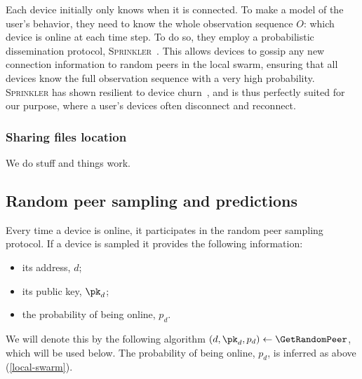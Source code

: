 Each device initially only knows when it is connected. 
To make a model of the user's behavior, they need to know the whole observation sequence $O$: which device is online at each time step.
To do so, they employ a probabilistic dissemination protocol, 
\textsc{Sprinkler}~\cite{luxey:hal-01704172}.
This allows devices to gossip any new connection information to random peers in 
the local swarm, ensuring that all devices know the full observation sequence 
with a very high probability.
\textsc{Sprinkler} has shown resilient to device churn~\cite{luxey:cascade}, and 
is thus perfectly suited for our purpose, where a user's devices often 
disconnect and reconnect. 




\subsubsection{Sharing files location}%
\label{ssub:sharing_files_location}

We do stuff and things work.



\subsection{Random peer sampling and predictions}




Every time a device is online, it participates in the random peer sampling 
protocol.
If a device is sampled it provides the following information:
\begin{itemize}
  \item its address, \(d\);
  \item its public key, \(\pk_d\);
  \item the probability of being online, \(p_d\).
\end{itemize}
We will denote this by the following algorithm \((d, \pk_d, p_d)\gets 
  \GetRandomPeer\), which will be used below.
The probability of being online, \(p_d\), is inferred as above 
(\cref{local-swarm}).


